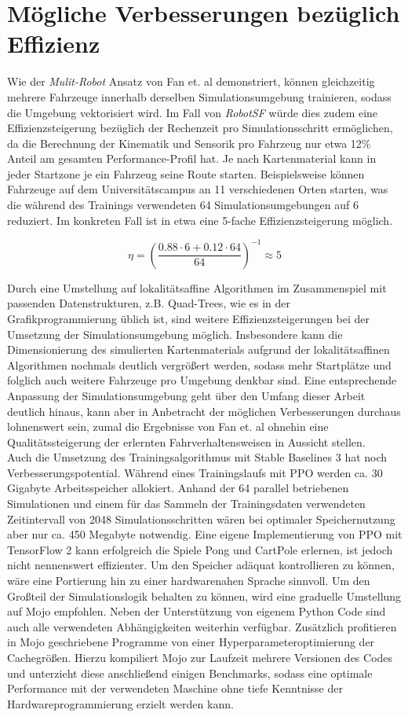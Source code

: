 \section{Mögliche Verbesserungen bezüglich Effizienz}
Wie der \emph{Mulit-Robot} Ansatz von Fan et. al \cite{fan2020distributed} demonstriert,
können gleichzeitig mehrere Fahrzeuge innerhalb derselben Simulationsumgebung trainieren,
sodass die Umgebung vektorisiert wird. Im Fall von \emph{RobotSF} würde dies zudem eine
Effizienzsteigerung bezüglich der Rechenzeit pro Simulationsschritt ermöglichen, da die
Berechnung der Kinematik und Sensorik pro Fahrzeug nur etwa 12\% Anteil am gesamten
Performance-Profil hat. Je nach Kartenmaterial kann in jeder Startzone je ein Fahrzeug
seine Route starten. Beispielsweise können Fahrzeuge auf dem Universitätscampus an 11
verschiedenen Orten starten, was die während des Trainings verwendeten 64
Simulationsumgebungen auf 6 reduziert. Im konkreten Fall ist in etwa eine 5-fache
Effizienzsteigerung möglich.

$$\eta = \left(\frac{0.88 \cdot 6 + 0.12 \cdot 64}{64}\right)^{-1} \approx 5$$

Durch eine Umstellung auf lokalitätsaffine Algorithmen im Zusammenspiel mit passenden
Datenstrukturen, z.B. Quad-Trees, wie es in der Grafikprogrammierung üblich ist,
sind weitere Effizienzsteigerungen bei der Umsetzung der Simulationsumgebung möglich.
Insbesondere kann die Dimensionierung des simulierten Kartenmaterials aufgrund der
lokalitätsaffinen Algorithmen nochmals deutlich vergrößert werden, sodass mehr
Startplätze und folglich auch weitere Fahrzeuge pro Umgebung denkbar sind.
Eine entsprechende Anpassung der Simulationsumgebung geht über den Umfang dieser Arbeit
deutlich hinaus, kann aber in Anbetracht der möglichen Verbesserungen durchaus
lohnenswert sein, zumal die Ergebnisse von Fan et. al \cite{fan2020distributed} ohnehin eine
Qualitätssteigerung der erlernten Fahrverhaltensweisen in Aussicht stellen.\\

Auch die Umsetzung des Trainingsalgorithmus mit Stable Baselines 3 hat noch
Verbesserungspotential. Während eines Trainingslaufs mit PPO werden ca. 30 Gigabyte
Arbeitsspeicher allokiert. Anhand der 64 parallel betriebenen Simulationen und einem
für das Sammeln der Trainingsdaten verwendeten Zeitintervall von 2048 Simulationsschritten
wären bei optimaler Speichernutzung aber nur ca. 450 Megabyte notwendig. Eine eigene
Implementierung von PPO mit TensorFlow 2 kann erfolgreich die Spiele Pong und CartPole
erlernen, ist jedoch nicht nennenswert effizienter. Um den Speicher adäquat kontrollieren
zu können, wäre eine Portierung hin zu einer hardwarenahen Sprache
sinnvoll. Um den Großteil der Simulationslogik behalten zu können, wird eine graduelle
Umstellung auf Mojo empfohlen. Neben der Unterstützung von eigenem Python Code sind
auch alle verwendeten Abhängigkeiten weiterhin verfügbar. Zusätzlich profitieren
in Mojo geschriebene Programme von einer Hyperparameteroptimierung der Cachegrößen.
Hierzu kompiliert Mojo zur Laufzeit mehrere Versionen des Codes und unterzieht diese
anschließend einigen Benchmarks, sodass eine optimale Performance mit der verwendeten
Maschine ohne tiefe Kenntnisse der Hardwareprogrammierung erzielt werden kann.
